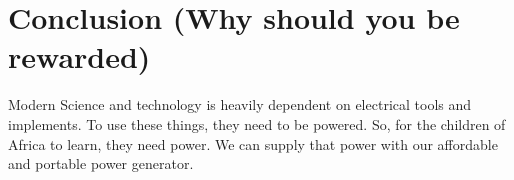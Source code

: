 \documentclass[11pt]{article}
\begin{document}
\section*{Conclusion (Why should you be rewarded)}
Modern Science and technology is heavily dependent on electrical tools and implements. To use these things, they need to be powered. So, for the children of Africa to learn, they need power. We can supply that power with our affordable and portable power generator.
\end{document}

